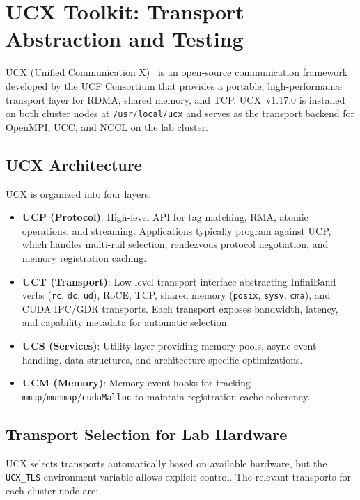 \documentclass[11pt,letterpaper]{article}
\begin{document}
\section{UCX Toolkit: Transport Abstraction and Testing}
\label{sec:ucx}

UCX (Unified Communication X)~\cite{ucx} is an open-source communication framework developed by the UCF Consortium that provides a portable, high-performance transport layer for RDMA, shared memory, and TCP. UCX~v1.17.0 is installed on both cluster nodes at \texttt{/usr/local/ucx} and serves as the transport backend for OpenMPI, UCC, and NCCL on the lab cluster.

\subsection{UCX Architecture}

UCX is organized into four layers:

\begin{itemize}[noitemsep]
    \item \textbf{UCP (Protocol)}: High-level API for tag matching, RMA, atomic operations, and streaming. Applications typically program against UCP, which handles multi-rail selection, rendezvous protocol negotiation, and memory registration caching.
    \item \textbf{UCT (Transport)}: Low-level transport interface abstracting InfiniBand verbs (\texttt{rc}, \texttt{dc}, \texttt{ud}), RoCE, TCP, shared memory (\texttt{posix}, \texttt{sysv}, \texttt{cma}), and CUDA IPC/GDR transports. Each transport exposes bandwidth, latency, and capability metadata for automatic selection.
    \item \textbf{UCS (Services)}: Utility layer providing memory pools, async event handling, data structures, and architecture-specific optimizations.
    \item \textbf{UCM (Memory)}: Memory event hooks for tracking \texttt{mmap}/\texttt{munmap}/\texttt{cudaMalloc} to maintain registration cache coherency.
\end{itemize}

\subsection{Transport Selection for Lab Hardware}

UCX selects transports automatically based on available hardware, but the \texttt{UCX\_TLS} environment variable allows explicit control. The relevant transports for each cluster node are:
\end{document}
